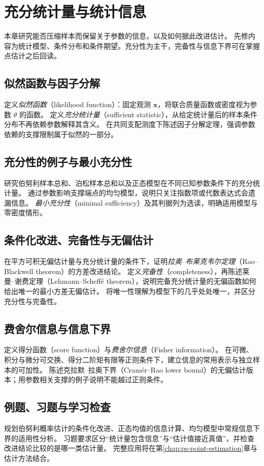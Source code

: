 \setcounter{chapter}{10} %
\chapter{充分统计量与统计信息}
\label{chap:ps-information}

本章研究能否压缩样本而保留关于参数的信息，以及如何据此改进估计。
先修内容为统计模型、条件分布和条件期望。充分性为主干，完备性与信息下界可在掌握点估计之后回读。

\section{似然函数与因子分解}
\label{sec:ps-likelihood-sufficiency}
定义\emph{似然函数}（likelihood function）：固定观测 $\mathbf x$，将联合质量函数或密度视为参数 $\theta$ 的函数。
定义\emph{充分统计量}（sufficient statistic），从给定统计量后的样本条件分布不再依赖参数解释其含义。
在共同支配测度下陈述因子分解定理，强调参数依赖的支撑限制属于似然的一部分。

\section{充分性的例子与最小充分性}
\label{sec:ps-minimal-sufficiency}
研究伯努利样本总和、泊松样本总和以及正态模型在不同已知参数条件下的充分统计量。
通过参数影响支撑端点的均匀模型，说明只关注指数项或代数表达式会遗漏信息。
\emph{最小充分性}（minimal sufficiency）及其判据列为选读，明确适用模型与零密度情形。

\section{条件化改进、完备性与无偏估计}
\label{sec:ps-rao-blackwell}
在平方可积无偏估计量与充分统计量的条件下，证明\emph{拉奥--布莱克韦尔定理}（Rao--Blackwell theorem）的方差改进结论。
定义\emph{完备性}（completeness），再陈述莱曼--谢费定理（Lehmann--Scheffé theorem），说明完备充分统计量的无偏函数如何给出唯一的最小方差无偏估计。
将唯一性理解为模型下的几乎处处唯一，并区分充分性与完备性。

\section{费舍尔信息与信息下界}
\label{sec:ps-fisher-information}
定义得分函数（score function）与\emph{费舍尔信息}（Fisher information）。
在可微、积分与微分可交换、得分二阶矩有限等正则条件下，建立信息的常用表示与独立样本的可加性。
陈述克拉默--拉奥下界（Cramér--Rao lower bound）的无偏估计版本；用参数相关支撑的例子说明不能越过正则条件。

\section{例题、习题与学习检查}
规划伯努利概率估计的条件化改进、正态均值的信息计算、均匀模型中常规信息下界的适用性分析。
习题要求区分“统计量包含信息”与“估计值接近真值”，并检查改进结论比较的是哪一类估计量。
完整应用将在第\ref{chap:ps-point-estimation}章与估计方法结合。






